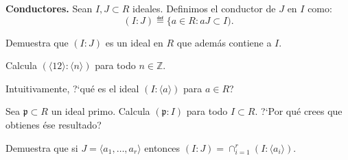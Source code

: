 \begin{problem}
{\bfseries Conductores.}
Sean $I, J\subset R$ ideales. Definimos el conductor de $J$ en $I$  como:
$$(I:J) ≝\{a\in R: aJ\subset I).$$

\ppart Demuestra que $(I:J)$ es un ideal en $R$ que además contiene a $I$.

\ppart Calcula $(\langle 12\rangle : \langle n \rangle)$ para todo  $n\in {\mathbb Z}$.

\ppart Intuitivamente,  ?`qué es el ideal $(I: \langle a\rangle)$ para $a\in R$?

\ppart Sea ${\mathfrak p}\subset R$ un ideal primo. Calcula $({\mathfrak p}: I)$ para todo $I\subset R$.
?`Por qué crees que obtienes ése   resultado?

\ppart Demuestra que si $J=\langle a_1,\ldots, a_r\rangle$ entonces $(I:J)=\cap_{i=1}^r(I: \langle a_i\rangle).$
\solution
\end{problem}

